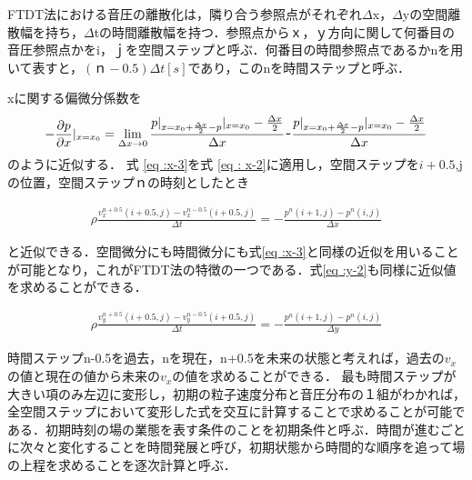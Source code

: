 \documentclass[a4j,12pt]{jsarticle}
\begin{document}
FTDT法における音圧の離散化は，隣り合う参照点がそれぞれ$\Delta$x，$\Delta$yの空間離散幅を持ち，$\Delta$tの時間離散幅を持つ．参照点からｘ，ｙ方向に関して何番目の音圧参照点かをi，ｊを空間ステップと呼ぶ．何番目の時間参照点であるかnを用いて表すと，$(ｎ-0.5)\Delta t[s]$であり，このnを時間ステップと呼ぶ．

xに関する偏微分係数を
\begin {eqnarray}
\label{eq :x-3}
- \frac { \partial p }{ \partial x }|_{ x=x_0} = \lim_{\Delta x \to 0} \frac{p|_{x=x_0+ \frac {\Delta x}{2} -p}| _{x=x_0} - \frac{ \Delta x}{2} }{ \Delta x} \verb|~| \frac{p|_{x=x_0+ \frac {\Delta x}{2} -p}| _{x=x_0} - \frac{ \Delta x}{2} }{ \Delta x}
\end{eqnarray}
のように近似する．
式 \ref{eq :x-3}を式 \ref{eq : x-2}に適用し，空間ステップを$i+0.5$,jの位置，空間ステップｎの時刻としたとき

\begin {eqnarray}
\label{eq:x-4}
\rho \frac{ v_x^{n+0.5}( i+0.5, j ) -v_x^{ n-0.5 }( i+0.5,j ) }{ \Delta t } = - \frac{ p^n( i+1 ,j ) -p^n( i,j ) }{ \Delta x }
\end{eqnarray}

と近似できる．空間微分にも時間微分にも式\ref{eq :x-3}と同様の近似を用いることが可能となり，これがFTDT法の特徴の一つである．式\ref{eq :y-2}も同様に近似値を求めることができる．

\begin {eqnarray}
\label{eq:y-4}
\rho \frac{ v_y^{n+0.5}( i+0.5, j ) -v_y^{ n-0.5 }( i+0.5,j ) }{ \Delta t } = - \frac{ p^n( i+1 ,j ) -p^n( i,j ) }{ \Delta y }
\end{eqnarray}


時間ステップn-0.5を過去，nを現在，n+0.5を未来の状態と考えれば，過去の$v_x$の値と現在の値から未来の$v_x$の値を求めることができる．
最も時間ステップが大きい項のみ左辺に変形し，初期の粒子速度分布と音圧分布の１組がわかれば，全空間ステップにおいて変形した式を交互に計算することで求めることが可能である．初期時刻の場の業態を表す条件のことを初期条件と呼ぶ．時間が進むごとに次々と変化することを時間発展と呼び，初期状態から時間的な順序を追って場の上程を求めることを逐次計算と呼ぶ．
\end{document}
